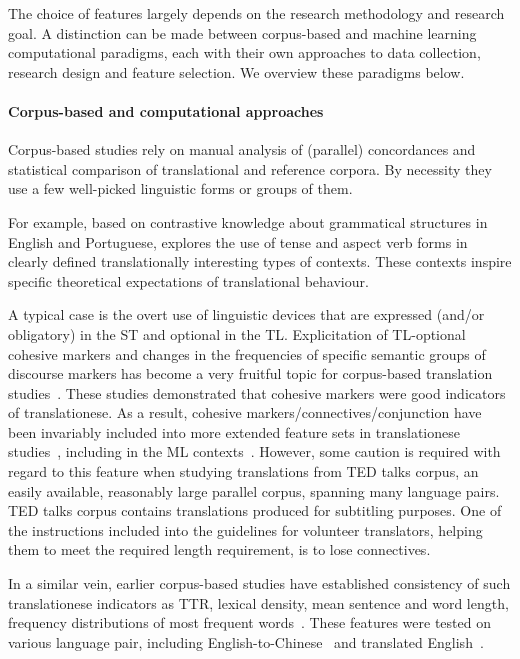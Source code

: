 The choice of features largely depends on the research methodology and research goal. A distinction can be made between corpus-based and machine learning computational paradigms, each with their own approaches to data collection, research design and feature selection. We overview these paradigms below.

\paragraph{Corpus-based and computational approaches} 
\label{pg:coling_begin}
Corpus-based studies rely on manual analysis of (parallel) concordances and statistical comparison of translational and reference corpora. By necessity they use a few well-picked linguistic forms or groups of them. 

For example, based on contrastive knowledge about grammatical structures in English and Portuguese, \citet{Santos1995} explores the use of tense and aspect verb forms in clearly defined translationally interesting types of contexts. These contexts inspire specific theoretical expectations of translational behaviour. 

A typical case is the overt use of linguistic devices that are expressed (and/or obligatory) in the \gls{ST} and optional in the \gls{TL}. 
Explicitation of TL-optional cohesive markers and changes in the frequencies of specific semantic groups of discourse markers has become a very fruitful topic for corpus-based translation studies~\cite{Olohan2001,Nakamura2007,Castagnoli2009,Becher2011,Kunilovskaya2017conn}. These studies demonstrated that cohesive markers were good indicators of translationese. As a result, cohesive markers/connectives/conjunction have been invariably included into more extended feature sets in translationese studies~\cite{Puurtinen2003,Rabadan2009,Xiao2010,Redelinghuys2015}, including in the ML contexts~\cite{Volansky2015}.
However, some caution is required with regard to this feature when studying translations from TED talks corpus, an easily available, reasonably large parallel corpus, spanning many language pairs. TED talks corpus contains translations produced for subtitling purposes. One of the instructions included into the guidelines for volunteer translators, helping them to meet the required length requirement, is to lose connectives.  

In a similar vein, earlier corpus-based studies have established consistency of such translationese indicators as \gls{TTR}, lexical density, mean sentence and word length, frequency distributions of most frequent words~\cite[known as `list head' from][]{Laviosa1998}. These features were tested on various language pair, including English-to-Chinese~\cite{Xiao2010} and translated English~\cite{Kruger2012,Redelinghuys2015}.

